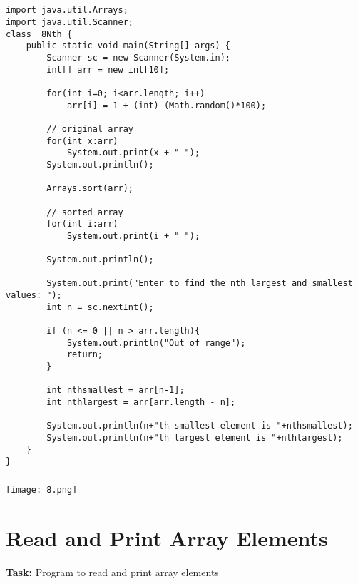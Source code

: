 \documentclass[12pt,a4paper]{article}
\begin{document}
\subsection{}
\begin{lstlisting}
import java.util.Arrays;
import java.util.Scanner;
class _8Nth {
    public static void main(String[] args) {
        Scanner sc = new Scanner(System.in);
        int[] arr = new int[10];
    
        for(int i=0; i<arr.length; i++)
            arr[i] = 1 + (int) (Math.random()*100);
    
        // original array
        for(int x:arr)
            System.out.print(x + " ");
        System.out.println();
    
        Arrays.sort(arr);
    
        // sorted array
        for(int i:arr)
            System.out.print(i + " ");
    
        System.out.println();
    
        System.out.print("Enter to find the nth largest and smallest values: ");
        int n = sc.nextInt();
    
        if (n <= 0 || n > arr.length){
            System.out.println("Out of range");
            return;
        }
    
        int nthsmallest = arr[n-1];
        int nthlargest = arr[arr.length - n];
    
        System.out.println(n+"th smallest element is "+nthsmallest);
        System.out.println(n+"th largest element is "+nthlargest);
    }
}
\end{lstlisting}

\subsubsection{}
\begin{center}
    \texttt{[image: 8.png]}
\end{center}


\section{Read and Print Array Elements}
\textbf{Task:} Program to read and print array elements
\end{document}
